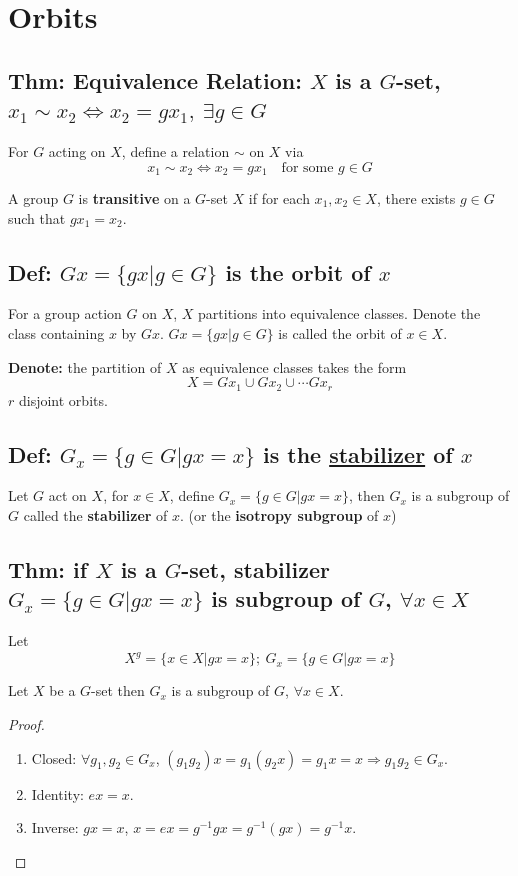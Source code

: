 \documentclass[11pt]{elegantbook}
\begin{document}
\section{Orbits}
\subsection{Thm: Equivalence Relation: $X$ is a $G$-set, $x_1\sim x_2 \Leftrightarrow x_2=gx_1,\ \exists g\in G$}
\begin{theorem}
    For $G$ acting on $X$, define a relation $\sim$ on $X$ via $$x_1\sim x_2\Leftrightarrow x_2=gx_1\quad \text{for some }g\in G$$
\end{theorem}

\begin{definition}
    A group $G$ is \textbf{transitive} on
    a $G$-set $X$ if for each $x_1,x_2\in X$, there exists $g \in G$ such that $gx_1=x_2$.
\end{definition}

\subsection{Def: $Gx=\{gx|g\in G\}$ is the orbit of $x$}
\begin{definition}
    For a group action $G$ on $X$, $X$ partitions into equivalence classes. Denote the class containing $x$ by $Gx$. $Gx=\{gx|g\in G\}$ is called the orbit of $x\in X$.
\end{definition}
\textbf{Denote:} the partition of $X$ as equivalence classes takes the form $$X=Gx_1\cup Gx_2\cup \cdots Gx_r$$
$r$ disjoint orbits.

\subsection{Def: $G_x=\{g\in G|gx=x\}$ is the \underline{stabilizer} of $x$}
\begin{definition}
    Let $G$ act on $X$, for $x\in X$, define $G_x=\{g\in G|gx=x\}$, then $G_x$ is a subgroup of $G$ called the \textbf{stabilizer} of $x$. (or the \textbf{isotropy subgroup} of $x$)
\end{definition}

\subsection{Thm: if $X$ is a $G$-set, stabilizer $G_x=\{g\in G\vert gx=x\}$ is subgroup of $G$, $\forall x\in X$}
Let $$X^g=\{x\in X\vert gx=x\};\ G_x=\{g\in G\vert gx=x\}$$
\begin{theorem}
    Let $X$ be a $G$-set then $G_x$ is a subgroup of $G$, $\forall x\in X$.
\end{theorem}
\begin{proof}\quad
\begin{enumerate}[(1)]
    \item Closed: $\forall g_1,g_2\in G_x$, $(g_1g_2)x=g_1(g_2x)=g_1x=x \Rightarrow g_1g_2\in G_x$.
    \item Identity: $ex=x$.
    \item Inverse: $gx=x$, $x=ex=g^{-1}gx=g^{-1}(gx)=g^{-1}x$.
\end{enumerate}
\end{proof}
\end{document}
